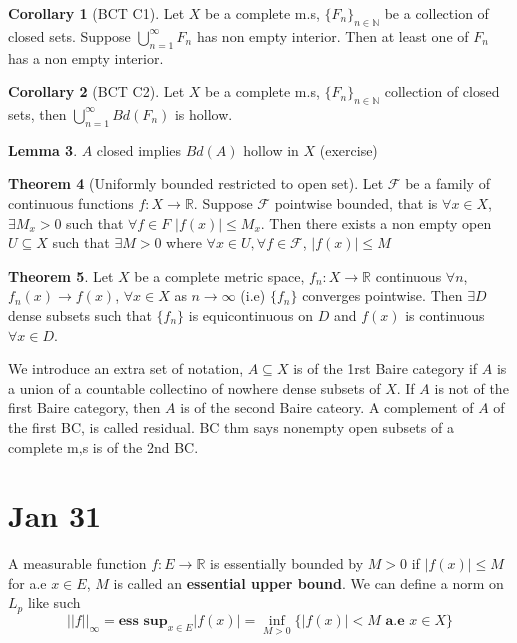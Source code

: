 \documentclass[13pt]{article}
\theoremstyle{definition} --- default
\newtheorem{theorem}{Theorem}
\newtheorem{corollary}[theorem]{Corollary}
\newtheorem{lemma}[theorem]{Lemma}
\theoremstyle{definition}
\theoremstyle{remark}
\begin{document}
	\begin{corollary}[BCT C1]
		Let $X$ be a complete m.s, $\{F_n\}_{n \in \mathbb{N}}$ be a collection of closed sets. Suppose $\bigcup_{n=1}^\infty F_n$ has non empty interior. Then at least one of $F_n$ has a non empty interior.		
	\end{corollary}
	\begin{corollary}[BCT C2]
		Let $X$ be a complete m.s, $\{F_n\}_{n \in \mathbb{N}}$ collection of closed sets, then $\bigcup_{n=1}^\infty Bd(F_n)$ is hollow.

	\end{corollary}
	\begin{lemma}
		$A$ closed implies $Bd(A)$ hollow in $X$ (exercise)	
	\end{lemma}
	\begin{theorem}[Uniformly bounded restricted to open set]
		Let $\mathcal{F}$ be a family of continuous functions $f \colon X \to \mathbb{R}$. Suppose $\mathcal{F}$ pointwise bounded, that is $\forall x \in X$, $\exists M_x > 0$ such that $\forall f \in F$ $|f(x)| \leq M_x$. Then there exists a non empty open $U \subseteq X$ such that $\exists M > 0$ where $\forall x \in U, \forall f \in \mathcal{F}$, $|f(x)| \leq M$ 
	\end{theorem}

	\begin{theorem}
		Let $X$ be a complete metric space, $f_n \colon X\to \mathbb{R}$ continuous $\forall n$, $f_n(x) \to f(x)$, $\forall x \in X$ as $n \to \infty$ (i.e) $\{f_n\}$ converges pointwise. Then $\exists D$ dense subsets such that $\{f_n\}$ is equicontinuous on $D$ and $f(x)$ is continuous $\forall x \in D$. 	
	\end{theorem}
	We introduce an extra set of notation, $A \subseteq X$ is of the 1rst Baire category if $A$ is a union of a countable collectino of nowhere dense subsets of $X$. If $A$ is not of the first Baire category, then $A$ is of the second Baire cateory. A complement of $A$ of the first BC, is called residual. BC thm says nonempty open subsets of a complete m,s is of the 2nd BC. 


	\section*{Jan 31}
	A measurable function $f \colon E \to \mathbb{R}$ is essentially bounded by $M > 0$ if $|f(x)| \leq M$ for a.e $x \in E$, $M$ is called an \textbf{essential upper bound}. 
	We can define a norm on $L_p$ like such
	$$||f||_{\infty} = \textbf{ess sup}_{x \in E} |f(x)| = \inf_{M > 0} \{|f(x)| < M \textbf{ a.e $x \in X$}\}$$
\end{document}
